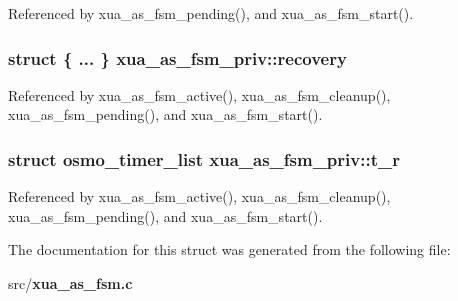 Referenced by xua\+\_\+as\+\_\+fsm\+\_\+pending(), and xua\+\_\+as\+\_\+fsm\+\_\+start().

\subsubsection[{recovery}]{\setlength{\rightskip}{0pt plus 5cm}struct \{ ... \}   xua\+\_\+as\+\_\+fsm\+\_\+priv\+::recovery}\label{structxua__as__fsm__priv_a1f80beb323a7b7248e7cd22aa27d94ac}


Referenced by xua\+\_\+as\+\_\+fsm\+\_\+active(), xua\+\_\+as\+\_\+fsm\+\_\+cleanup(), xua\+\_\+as\+\_\+fsm\+\_\+pending(), and xua\+\_\+as\+\_\+fsm\+\_\+start().

\subsubsection[{t\+\_\+r}]{\setlength{\rightskip}{0pt plus 5cm}struct osmo\+\_\+timer\+\_\+list xua\+\_\+as\+\_\+fsm\+\_\+priv\+::t\+\_\+r}\label{structxua__as__fsm__priv_a049816e489871fc19420f90e1ae52761}


Referenced by xua\+\_\+as\+\_\+fsm\+\_\+active(), xua\+\_\+as\+\_\+fsm\+\_\+cleanup(), xua\+\_\+as\+\_\+fsm\+\_\+pending(), and xua\+\_\+as\+\_\+fsm\+\_\+start().



The documentation for this struct was generated from the following file\+:\begin{DoxyCompactItemize}
\item 
src/{\bf xua\+\_\+as\+\_\+fsm.\+c}\end{DoxyCompactItemize}
